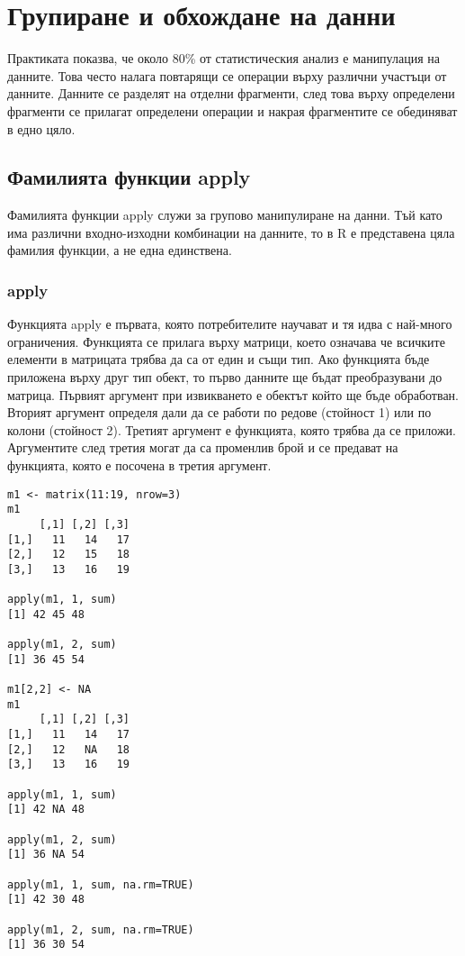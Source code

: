 ﻿\newpage
\chapter{Групиране и обхождане на данни}
\label{chapter06}

Практиката показва, че около 80\% от статистическия анализ е манипулация на данните. Това често налага повтарящи се операции върху различни участъци от данните. Данните се разделят на отделни фрагменти, след това върху определени фрагменти се прилагат определени операции и накрая фрагментите се обединяват в едно цяло. 

\section{Фамилията функции apply}

Фамилията функции apply служи за групово манипулиране на данни. Тъй като има различни входно-изходни комбинации на данните, то в R е представена цяла фамилия функции, а не една единствена.

\subsection{apply}

Функцията apply е първата, която потребителите научават и тя идва с най-много ограничения. Функцията се прилага върху матрици, което означава че всичките елементи в матрицата трябва да са от един и същи тип. Ако функцията бъде приложена върху друг тип обект, то първо данните ще бъдат преобразувани до матрица. Първият аргумент при извикването е обектът който ще бъде обработван. Вторият аргумент определя дали да се работи по редове (стойност 1) или по колони (стойност 2). Третият аргумент е функцията, която трябва да се приложи. Аргументите след третия могат да са променлив брой и се предават на функцията, която е посочена в третия аргумент. 

\begin{lstlisting}[caption=Сума по редове и колони, label=listing0093]
m1 <- matrix(11:19, nrow=3)
m1
     [,1] [,2] [,3]
[1,]   11   14   17
[2,]   12   15   18
[3,]   13   16   19
 
apply(m1, 1, sum)
[1] 42 45 48
 
apply(m1, 2, sum)
[1] 36 45 54

m1[2,2] <- NA
m1
     [,1] [,2] [,3]
[1,]   11   14   17
[2,]   12   NA   18
[3,]   13   16   19

apply(m1, 1, sum)
[1] 42 NA 48

apply(m1, 2, sum)
[1] 36 NA 54

apply(m1, 1, sum, na.rm=TRUE)
[1] 42 30 48

apply(m1, 2, sum, na.rm=TRUE)
[1] 36 30 54
\end{lstlisting}

